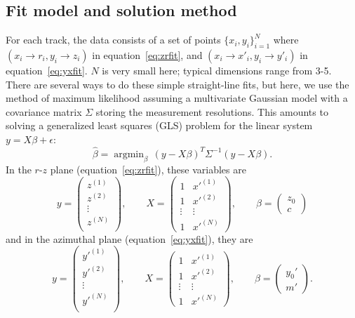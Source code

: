 \documentclass[12pt]{article}
\DeclareMathOperator*{\argmin}{argmin}
\begin{document}
\subsection{Fit model and solution method} \label{sec:lsq}
 For each track, the data consists of a set of points $\{x_i,y_i\}_{i=1}^N$ where $(x_i \to r_i, y_i \to z_i)$ in equation~\ref{eq:zrfit}, and $(x_i \to x'_i, y_i \to y'_i)$ in equation~\ref{eq:yxfit}. $N$ is very small here; typical dimensions range from 3-5. There are several ways to do these simple straight-line fits, but here, we use the method of maximum likelihood assuming a multivariate Gaussian model with a covariance matrix $\Sigma$ storing the measurement resolutions. This amounts to solving a generalized least squares (GLS) problem for the linear system $y = X\beta + \epsilon$:
 \begin{equation}\label{eq:gls}
 \hat\beta = \argmin_{\beta} \, (y - X\beta)^T \Sigma^{-1} (y - X\beta).
 \end{equation}
In the $r$-$z$ plane (equation~\ref{eq:zrfit}), these variables are
\begin{equation} \label{eq:rzmat}
y = 
 \begin{pmatrix}
 z^{(1)}\\
 z^{(2)}\\
 \vdots \\
 z^{(N)}\\
 \end{pmatrix},
 \qquad
X =
 \begin{pmatrix}
  1 & x'^{(1)} \\
  1 & x'^{(2)} \\
  \vdots  & \vdots \\
  1 & x'^{(N)} 
 \end{pmatrix},
 \qquad
\beta = 
 \begin{pmatrix}
 z_0\\
 c
 \end{pmatrix}
\end{equation}
and in the azimuthal plane (equation~\ref{eq:yxfit}), they are
\begin{equation} \label{eq:xymat}
y = 
 \begin{pmatrix}
 y'^{(1)}\\
 y'^{(2)}\\
 \vdots \\
 y'^{(N)}\\
 \end{pmatrix},
 \qquad
X =
 \begin{pmatrix}
  1 & x'^{(1)} \\
  1 & x'^{(2)} \\
  \vdots  & \vdots \\
  1 & x'^{(N)} 
 \end{pmatrix},
 \qquad
\beta = 
 \begin{pmatrix}
 y_0'\\
 m'
 \end{pmatrix}.
\end{equation}
\end{document}

